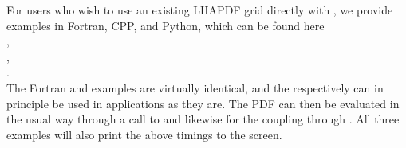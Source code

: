 For users who wish to use an existing LHAPDF grid directly with
\hoppet{}, we provide examples in Fortran, CPP{}, and Python, which
can be found here \\[0.2cm]
, \\
, \\
. \\[0.2cm]

The Fortran and \CPP{} examples are virtually identical, and the
 respectively 
 can in principle be used in
applications as they are. The PDF can then be evaluated in the usual
way through a call to  and likewise for the coupling
through . All three examples will also print the
above timings to the screen.

